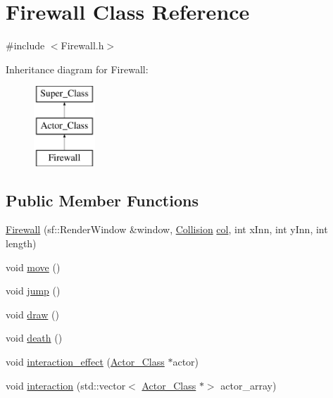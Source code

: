 \hypertarget{class_firewall}{}\section{Firewall Class Reference}
\label{class_firewall}


{\ttfamily \#include $<$Firewall.\+h$>$}

Inheritance diagram for Firewall\+:\begin{figure}[H]
\begin{center}
\leavevmode
\includegraphics[height=3.000000cm]{class_firewall}
\end{center}
\end{figure}
\subsection*{Public Member Functions}
\begin{DoxyCompactItemize}
\item 
\hyperlink{class_firewall_a77f12236ebbdcc218d03366774aa9aab}{Firewall} (sf\+::\+Render\+Window \&window, \hyperlink{class_collision}{Collision} \hyperlink{class_firewall_af1c215a26c43f1339ca1247f02f0d91e}{col}, int x\+Inn, int y\+Inn, int length)
\item 
void \hyperlink{class_firewall_ac08bd22ea41caaa8ab269a9b1e0d36aa}{move} ()
\item 
void \hyperlink{class_firewall_a6fd8ce6bf5731d822c0d47ee209dbe8d}{jump} ()
\item 
void \hyperlink{class_firewall_a3e67e39efb0a425acd1f009f86e434ee}{draw} ()
\item 
void \hyperlink{class_firewall_a506013f97478b8937becdac038c45c8e}{death} ()
\item 
void \hyperlink{class_firewall_a035dac1c484fe153ca14710777c617cb}{interaction\+\_\+effect} (\hyperlink{class_actor___class}{Actor\+\_\+\+Class} $\ast$actor)
\item 
void \hyperlink{class_firewall_a21c3c46eaf7bb026b73a77b0288fa232}{interaction} (std\+::vector$<$ \hyperlink{class_actor___class}{Actor\+\_\+\+Class} $\ast$$>$ actor\+\_\+array)
\end{DoxyCompactItemize}
